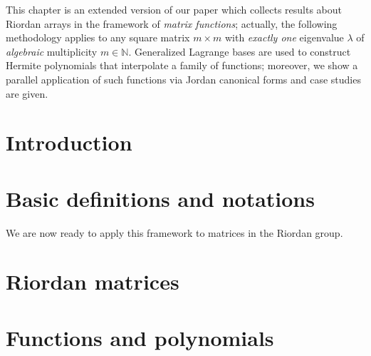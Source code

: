 


This chapter is an extended version of our paper
\citep{Merlini:Nocentini:matrices:functions} which collects results about
Riordan arrays in the framework of \textit{matrix functions};  actually,
the following methodology applies to any square matrix $m\times m$ with
\textit{exactly one} eigenvalue $\lambda$ of \textit{algebraic}
multiplicity $m \in\mathbb{N}$.  Generalized Lagrange bases are used to
construct Hermite polynomials that interpolate a family of functions;
moreover, we show a parallel application of such functions via Jordan
canonical forms and case studies are given.


\section{Introduction}

\label{sec:introduction}


\section{Basic definitions and notations}



We are now ready to apply this framework to matrices in the Riordan group.

\section{Riordan matrices}



\iffalse %



\subsection{A component matrices characterization of Hermite interpolating polynomials}


\fi

\section{Functions and polynomials}

